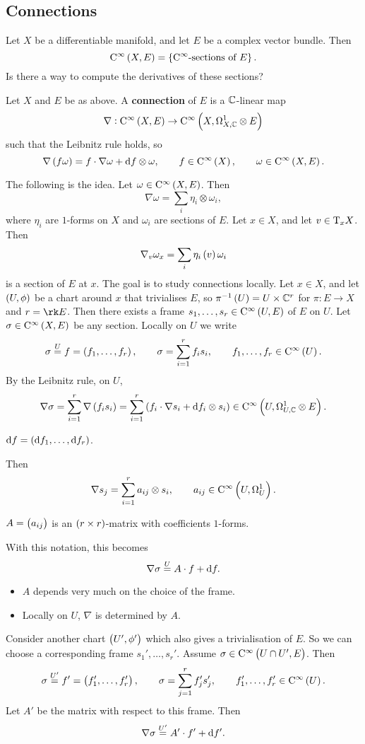 \subsection{Connections}

Let $ X $ be a differentiable manifold, and let $ E $ be a complex vector bundle. Then
$$ \Ci{X, E} = \cbr{\text{$ \C^\infty $-sections of} \ E}. $$
Is there a way to compute the derivatives of these sections?

\begin{definition}
Let $ X $ and $ E $ be as above. A \textbf{connection} of $ E $ is a $ \mathbb{C} $-linear map
$$ \nabla : \Ci{X, E} \to \COCE{X}{1}{E} $$
such that the Leibnitz rule holds, so
$$ \nabla\br{f\omega} = f \cdot \nabla\omega + \d f \otimes \omega, \qquad f \in \Ci{X}, \qquad \omega \in \Ci{X, E}. $$
\end{definition}

The following is the idea. Let $ \omega \in \Ci{X, E} $. Then
$$ \nabla\omega = \sum_i \eta_i \otimes \omega_i, $$
where $ \eta_i $ are $ 1 $-forms on $ X $ and $ \omega_i $ are sections of $ E $. Let $ x \in X $, and let $ v \in \mathrm{T}_xX $. Then
$$ \nabla_v\omega_x = \sum_i \eta_i\br{v}\omega_i $$
is a section of $ E $ at $ x $. The goal is to study connections locally. Let $ x \in X $, and let $ \br{U, \phi} $ be a chart around $ x $ that trivialises $ E $, so $ \pi^{-1}\br{U} = U \times \CC^r $ for $ \pi : E \to X $ and $ r = \rk E $. Then there exists a frame $ s_1, \dots, s_r \in \Ci{U, E} $ of $ E $ on $ U $. Let $ \sigma \in \Ci{X, E} $ be any section. Locally on $ U $ we write
$$ \sigma \overset{U}{=} f = \br{f_1, \dots, f_r}, \qquad \sigma = \sum_{i = 1}^r f_is_i, \qquad f_1, \dots, f_r \in \Ci{U}. $$
By the Leibnitz rule, on $ U $,
$$ \nabla\sigma = \sum_{i = 1}^r \nabla\br{f_is_i} = \sum_{i = 1}^r \br{f_i \cdot \nabla s_i + \d f_i \otimes s_i} \in \COCE{U}{1}{E}. $$

\begin{notation*}
$ \d f = \br{\d f_1, \dots, \d f_r} $.
\end{notation*}

Then
$$ \nabla s_j = \sum_{i = 1}^r a_{ij} \otimes s_i, \qquad a_{ij} \in \CO{U}{1}. $$

\begin{notation*}
$ A = \br{a_{ij}} $ is an $ \br{r \times r} $-matrix with coefficients $ 1 $-forms.
\end{notation*}

With this notation, this becomes
$$ \nabla\sigma \overset{U}{=} A \cdot f + \mathrm{d} f. $$
\begin{itemize}
\item $ A $ depends very much on the choice of the frame.
\item Locally on $ U $, $ \nabla $ is determined by $ A $.
\end{itemize}
Consider another chart $ \br{U', \phi'} $ which also gives a trivialisation of $ E $. So we can choose a corresponding frame $ s_1', \dots, s_r' $. Assume $ \sigma \in \Ci{U \cap U', E} $. Then
$$ \sigma \overset{U'}{=} f' = \br{f_1', \dots, f_r'}, \qquad \sigma = \sum_{j = 1}^r f_j's_j', \qquad f_1', \dots, f_r' \in \Ci{U}. $$
Let $ A' $ be the matrix with respect to this frame. Then
$$ \nabla\sigma \overset{U'}{=} A' \cdot f' + \mathrm{d} f'. $$

